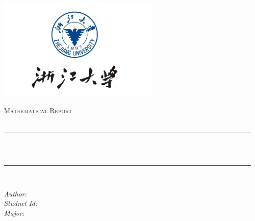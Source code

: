 \begin{titlepage}

    \newcommand{\HRule}{\rule{\linewidth}{0.5mm}}
    
    \centering
    \includegraphics[width=8cm]{title/logo.png}\\[1cm] 
     
    \begin{center}
    \textsc{\LARGE Mathematical Report}\\[2.0cm] 
    \textsc{\Large \CourseName{}}\\[0.5cm] 
    \end{center}

    \makeatletter
    \HRule \\[0.4cm]
    { \huge \bfseries \Title}\\[0.4cm] 
    \HRule \\[2.5cm]
    
    \begin{center}
    \emph{Author:} \@author\\[0.2cm] 
    \emph{Studnet Id:} \StudentId{}\\[0.2cm]
    \emph{Major:} \Major{}\\[2cm] 
    \end{center}

    \vfill 
\end{titlepage}